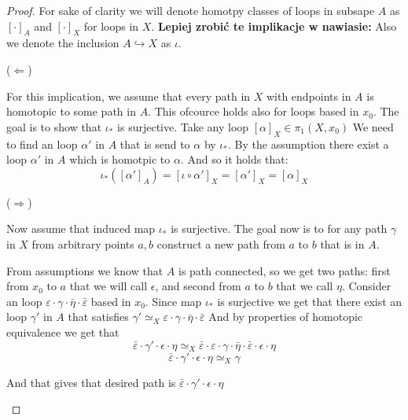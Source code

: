 \documentclass[11pt, a4paper, final]{amsart}
\newcommand\todo[1]{\textbf{\textcolor{redd}{#1}}}
\numberwithin{theorem}{section}
\theoremstyle{definition}
\theoremstyle{remark}
\begin{document}
\begin{proof}
    For sake of clarity we will denote homotpy classes of loops in subsape $A$ as $[\cdot]_A$ and $[\cdot]_X$ for loops in $X$.
    \todo{Lepiej zrobić te implikacje w nawiasie:} Also we denote the inclusion $A \hookrightarrow X$ as $\iota$.
    
    ($\Leftarrow$)
    
    For this implication, we assume that every path in $X$ with endpoints in $A$ is homotopic to some path in $A$. This 
    ofcource holds also for loops based in $x_0$. The goal is to show that $\iota_{*}$ is surjective. Take any loop $[\alpha]_X \in \pi_1(X, x_0)$
    We need to find an loop $\alpha'$ in $A$ that is send to $\alpha$ by $\iota_{*}$.
    By the assumption there exist a loop $\alpha'$ in $A$ which is homotpic to $\alpha$. And so it holds that:
    $$\iota_{*}([\alpha']_A) = [\iota \circ \alpha']_X = [\alpha']_X = [\alpha]_X$$

    ($\Rightarrow$)

    Now assume that induced map $\iota_{*}$ is surjective. The goal now is to for any path $\gamma$ in $X$ 
    from arbitrary points $a,b$ construct a new path from $a$ to $b$ that is in $A$.

    From assumptions we know that $A$ is path connected, so we get two paths:
    first from $x_0$ to $a$ that we will call $\epsilon$, and second from $a$ to $b$ that we call $\eta$.
    Consider an loop $\varepsilon \cdot \gamma \cdot \bar{\eta} \cdot \bar{\varepsilon}$ based in $x_0$. Since map $\iota_{*}$ 
    is surjective we get that there exist an loop $\gamma'$ in $A$ that satisfies $\gamma' \simeq_X \varepsilon \cdot \gamma \cdot \bar{\eta} \cdot \bar{\varepsilon}$
    And by properties of homotopic equivalence we get that 
    $$\bar{\varepsilon} \cdot \gamma' \cdot \epsilon \cdot \eta \simeq_X  \bar{\varepsilon} \cdot \varepsilon \cdot \gamma \cdot \bar{\eta} \cdot \bar{\varepsilon} \cdot \epsilon \cdot \eta$$
    $$\bar{\varepsilon} \cdot \gamma' \cdot \epsilon \cdot \eta \simeq_X \gamma$$

    And that gives that desired path is $\bar{\varepsilon} \cdot \gamma' \cdot \epsilon \cdot \eta$

    
    \begin{center}
        
    \end{center}



\end{proof}
\end{document}
